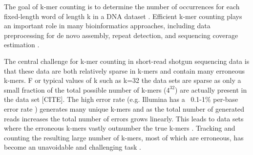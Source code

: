 \documentclass{article}
\begin{document}
The goal of k-mer counting is to determine the number of occurrences
for each fixed-length word of length k in a DNA dataset
\cite{Marcias2011}. Efficient k-mer counting plays an important role
in many bioinformatics approaches, including data preprocessing for de
novo assembly, repeat detection, and sequencing coverage estimation
\cite{Kurtz2008}.



The central challenge for k-mer counting in short-read shotgun
sequencing data is that these data are both relatively sparse in
k-mers and contain many erroneous k-mers.  F or typical values of k such as k=32 the data sets are sparse as only a small fraction of
the total possible number of k-mers ($4^{32}$) are actually present in
the data set [CITE].  The high error rate (e.g. Illumina has a ~0.1-1\%
per-base error rate \cite{pubmed19997069}) generates many unique k-mers and as the total number of generated reads increases the
total number of errors grows linearly. This leads to data sets where the
erroneous k-mers vastly outnumber the true k-mers \cite{Conway2011}.
Tracking and counting the resulting large number of k-mers, most of
which are erroneous, has become an unavoidable and challenging task
\cite{Minoche2011}.
\end{document}
